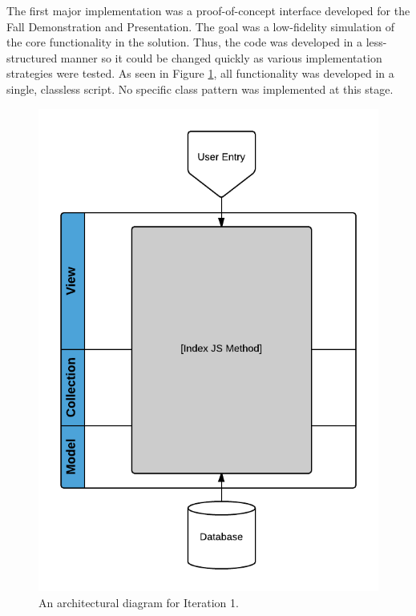 \documentclass{report}
\begin{document}
The first major implementation was a proof-of-concept interface developed for the Fall Demonstration and Presentation. The goal was a low-fidelity simulation of the core functionality in the solution. Thus, the code was developed in a less-structured manner so it could be changed quickly as various implementation strategies were tested. As seen in Figure \ref{fig:iteration1}, all functionality was developed in a single, classless script. No specific class pattern was implemented at this stage.

\begin{figure}[htbp!]
  \begin{centering}
    \includegraphics[scale=0.25]{figures/Iteration-1.png}
    \caption{An architectural diagram for Iteration 1.}
    \label{fig:iteration1}
  \end{centering}
\end{figure}
\end{document}
